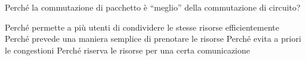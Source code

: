 \question
Perché la commutazione di pacchetto è \enquote{meglio} della commutazione di circuito?

\begin{checkboxes}
	\CorrectChoice Perché permette a più utenti di condividere le stesse risorse efficientemente
	\choice Perché prevede una maniera semplice di prenotare le risorse
	\choice Perché evita a priori le congestioni
	\choice Perché riserva le risorse per una certa comunicazione
\end{checkboxes}

\begin{solution}

\end{solution}
